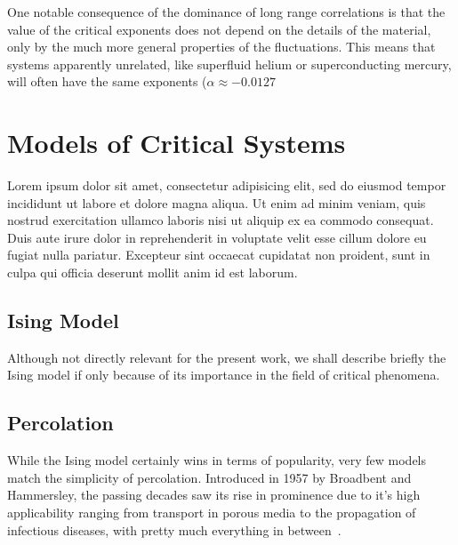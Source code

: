 One notable consequence of the dominance of long range correlations is that the
value of the critical exponents does not depend on the details of the material,
only by the much more general properties of the fluctuations. This means that
systems apparently unrelated, like superfluid helium or superconducting mercury,
will often have the same exponents ($\alpha\approx-0.0127$


\section{Models of Critical Systems}
\label{sec:models}

Lorem ipsum dolor sit amet, consectetur adipisicing elit, sed do eiusmod tempor
incididunt ut labore et dolore magna aliqua. Ut enim ad minim veniam, quis
nostrud exercitation ullamco laboris nisi ut aliquip ex ea commodo consequat.
Duis aute irure dolor in reprehenderit in voluptate velit esse cillum dolore eu
fugiat nulla pariatur. Excepteur sint occaecat cupidatat non proident, sunt in
culpa qui officia deserunt mollit anim id est laborum.

\subsection{Ising Model}
\label{sec:ising}

Although not directly relevant for the present work, we shall describe briefly
the Ising model if only because of its importance in the field of critical
phenomena.


\subsection{Percolation}
\label{sec:perc}

While the Ising model certainly wins in terms of popularity, very few models
match the simplicity of percolation. Introduced in 1957 by Broadbent and
Hammersley, the passing decades saw its rise in prominence due to it's high
applicability ranging from transport in porous media to the propagation of
infectious diseases, with pretty much everything in between~\cite{Araujo2013}.
